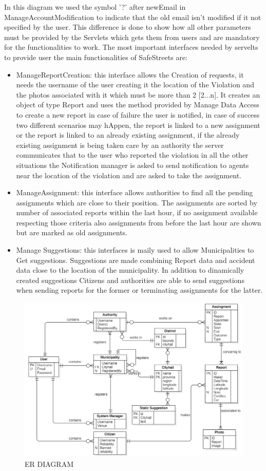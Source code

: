 In this diagram we used the symbol '?' after newEmail in ManageAccountModification to indicate that the old email isn't modified  if it not specified by the user. This difference is done to show how all other parameters must be provided by the Servlets which gets them from users and are mandatory for the functionalities to work.
The most important interfaces needed by servelts to provide user the main functionalities of SafeStreets are:
\begin{itemize}
\item ManageReportCreation: this interface allows the Creation of requests, it needs the username of the user creating it the location of the Violation and the photos associated with it which must be more than 2 [2...n]. It creates an object of type Report and uses the method provided by Manage Data Access to create a new report in case of failure the user is notified, in case of success two different scenarios may hAppen, the report is linked to a new assignment or the report is linked to an already existing assignment, if the already existing assignment is being taken care by an authority the server communicates that to the user who reported the violation in all the other situations the Notification manager is asked to send notification to agents near the location of the violation and are asked to take the assignment.
\item ManageAssignment: this interface allows authorities to find all the pending assignments which are close to their position. The assignments are sorted by number of associated reports within the last hour, if no assignment available respecting those criteria also assignments from before the last hour are shown but are marked as old assignments.
\item Manage Suggestions: this interfaces is maily used to allow Municipalities to Get suggestions. Suggestions are made combining Report data and accident data close to the location of the municipality. In addition to dinamically created suggestions Citizens and authorities are able to send suggestions when sending reports for the former or terminating assignments for the latter.
\end{itemize}
\begin{figure}[H]
\centering
\includegraphics[width=\textwidth]{Images/ER.png}
\caption{\label{fig:ComWI}ER DIAGRAM }
\end{figure}
